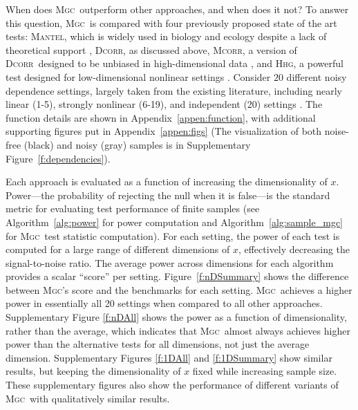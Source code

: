 \documentclass[11pt]{article}
\providecommand{\sct}[1]{{\normalfont\textsc{#1}}}
\newcommand{\Mgc}{\sct{Mgc}}
\newcommand{\Hhg}{\sct{Hhg}}
\newcommand{\Dcorr}{\sct{Dcorr}}
\newcommand{\Mcorr}{\sct{Mcorr}}
\newcommand{\Mantel}{\sct{Mantel}}
\begin{document}
When does \Mgc~outperform other approaches, and when does it not?
To answer this question, \Mgc~is compared with four previously proposed state of the art tests: \Mantel, which is widely used in biology and ecology despite a lack of theoretical support \cite{Mantel1967}, \Dcorr, as discussed above, \Mcorr, a version of \Dcorr~designed to be unbiased in high-dimensional data \cite{SzekelyRizzo2013a}, and \Hhg, a powerful test designed for low-dimensional nonlinear settings \cite{HellerGorfine2013}. 
Consider $20$ different noisy dependence settings, largely taken from the existing literature, including  nearly linear (1-5), strongly nonlinear (6-19), and independent (20) settings \cite{SzekelyRizzoBakirov2007, SimonTibshirani2012, GorfineHellerHeller2012, HellerGorfine2013, SzekelyRizzo2013a}.  
The function details are shown in Appendix~\ref{appen:function}, with additional supporting figures put in Appendix~\ref{appen:figs} (The visualization of both noise-free (black) and noisy (gray) samples is in Supplementary Figure~\ref{f:dependencies}).  


Each approach is evaluated as a function of increasing the dimensionality of $x$.  Power---the probability of rejecting the null when it is  false---is the standard metric for evaluating test performance of finite samples (see Algorithm~\ref{alg:power} for power computation and Algorithm~\ref{alg:sample_mgc} for \Mgc~test statistic computation).  
For each setting, the power of each test is computed for a large range of different dimensions of $x$,  effectively decreasing the signal-to-noise ratio.  
The average power across dimensions for each algorithm provides a scalar ``score'' per setting.  %
Figure~\ref{f:nDSummary} shows the difference between \Mgc's score and the benchmarks for each setting.  
\Mgc~achieves a higher power in essentially all 20 settings when compared to all other approaches.  
Supplementary Figure \ref{f:nDAll} shows the power as a function of dimensionality, rather than the average, which indicates that  \Mgc~almost always achieves higher power than the alternative tests for all dimensions, not just the average dimension.  
 Supplementary Figures \ref{f:1DAll} and \ref{f:1DSummary} show similar results,  but keeping the dimensionality of $x$ fixed while increasing sample size. These supplementary figures also show the performance of different variants of \Mgc~with qualitatively similar results.%
\end{document}
